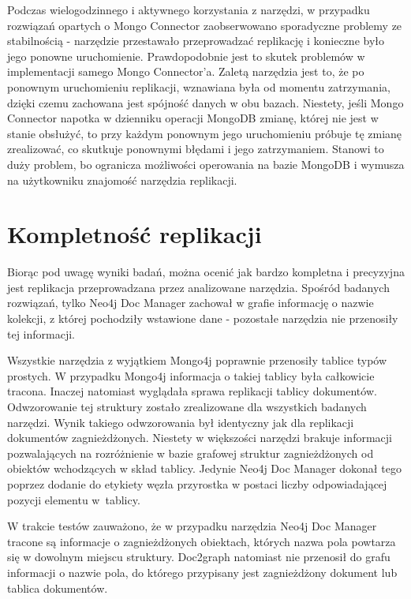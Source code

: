 \documentclass[a4paper,twoside,12pt]{book}
\begin{document}
Podczas wielogodzinnego i aktywnego korzystania z narzędzi, w przypadku rozwiązań opartych o Mongo Connector zaobserwowano sporadyczne problemy ze stabilnością - narzędzie przestawało przeprowadzać replikację i konieczne było jego ponowne uruchomienie. Prawdopodobnie jest to skutek problemów w implementacji samego Mongo Connector'a. Zaletą narzędzia jest to, że po ponownym uruchomieniu replikacji, wznawiana była od momentu zatrzymania, dzięki czemu zachowana jest spójność danych w obu bazach. Niestety, jeśli Mongo Connector napotka w dzienniku operacji MongoDB zmianę, której nie jest w stanie obsłużyć, to przy każdym ponownym jego uruchomieniu próbuje tę zmianę zrealizować, co skutkuje ponownymi błędami i jego zatrzymaniem. Stanowi to duży problem, bo ogranicza możliwości operowania na bazie MongoDB i wymusza na użytkowniku znajomość narzędzia replikacji. 

\section{Kompletność replikacji}

Biorąc pod uwagę wyniki badań, można ocenić jak bardzo kompletna i precyzyjna jest replikacja przeprowadzana przez analizowane narzędzia. Spośród badanych rozwiązań, tylko Neo4j Doc Manager zachował w grafie informację o nazwie kolekcji, z której pochodziły wstawione dane - pozostałe narzędzia nie przenosiły tej informacji.

Wszystkie narzędzia z wyjątkiem Mongo4j poprawnie przenosiły tablice typów prostych. W przypadku Mongo4j informacja o takiej tablicy była całkowicie tracona. Inaczej natomiast wyglądała sprawa replikacji tablicy dokumentów. Odwzorowanie tej struktury zostało zrealizowane dla wszystkich badanych narzędzi. Wynik takiego odwzorowania był identyczny jak dla replikacji dokumentów zagnieżdżonych. Niestety w większości narzędzi brakuje informacji pozwalających na rozróżnienie w bazie grafowej struktur zagnieżdżonych od obiektów wchodzących w skład tablicy. Jedynie Neo4j Doc Manager dokonał tego poprzez dodanie do etykiety węzła przyrostka w postaci liczby odpowiadającej pozycji elementu w~tablicy.

W trakcie testów zauważono, że w przypadku narzędzia Neo4j Doc Manager tracone są informacje o zagnieżdżonych obiektach, których nazwa pola powtarza się w dowolnym miejscu struktury. Doc2graph natomiast nie przenosił do grafu informacji o nazwie pola, do którego przypisany jest zagnieżdżony dokument lub tablica dokumentów.
\end{document}
